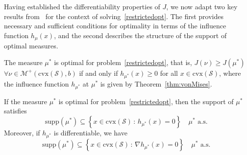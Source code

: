 \documentclass[stsy,sglanonrev]{informs4}
\begin{document}
Having established the differentiability properties of \( J \), we now adapt two key results from~\cite{yu2024det} for the context of solving~\eqref{restrictedopt}. The first provides necessary and sufficient conditions for optimality in terms of the influence function \( h_{\mu}(x) \), and the second describes the structure of the support of optimal measures.
\begin{theorem}\label{thm:optCondition} The measure $\mu^*$ is optimal for problem~\eqref{restrictedopt}, that is, $J(\nu) \geq J(\mu^*)$ $\forall \nu \in \mathcal{M}^+(\mathrm{cvx}(\mathcal{S}),b)$ if and only if $h_{\mu^*}(x) \geq 0$ for all $x \in \mathrm{cvx}(\mathcal{S})$, where the influence function $h_{\mu^*}$ at $\mu^*$ is given by Theorem~\ref{thm:vonMises}.
\end{theorem}
\begin{lemma}\label{lem:supportopt} If the measure $\mu^*$ is optimal for problem~\eqref{restrictedopt}, then the support of $\mu^*$ satisfies \begin{equation}\label{suppinfl}
    \mathrm{supp}(\mu^*) \subseteq \left\{ x \in \mathrm{cvx}(\mathcal{S})\,:\,h_{\mu^*}(x)=0 \right\} \quad \mu^* \mbox{ a.s.\ }
\end{equation} Moreover, if $h_{\mu^*}$ is differentiable, we have  \begin{equation}\label{suppdinfl}
    \mathrm{supp}(\mu^*) \subseteq \left\{ x \in \mathrm{cvx}(\mathcal{S})\,:\,\nabla h_{\mu^*}(x)=0 \right\} \quad \mu^* \mbox{ a.s.\ }
\end{equation}
\end{lemma}
\end{document}
